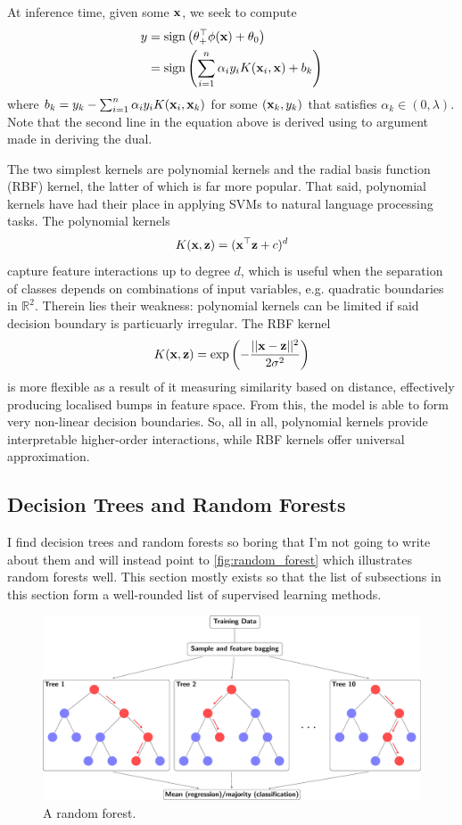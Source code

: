 \documentclass[11pt]{article}
\begin{document}
At inference time, given some $\mathbf{x}$, we seek to compute
\begin{align*}
    y
    &=
    \text{sign}\left(\theta_+^\top\phi(\mathbf{x})+\theta_0\right)\\
    &=
    \text{sign}\left(\sum_{i=1}^n\alpha_iy_iK(\mathbf{x}_i,\mathbf{x})+b_k\right)
\end{align*}
where $b_k=y_k-\sum_{i=1}^n\alpha_iy_iK(\mathbf{x}_i,\mathbf{x}_k)$ for some $(\mathbf{x}_k,y_k)$ that satisfies $\alpha_k\in(0,\lambda)$. Note that the second line in the equation above is derived using to argument made in deriving the dual.

The two simplest kernels are polynomial kernels and the radial basis function (RBF) kernel, the latter of which is far more popular. That said, polynomial kernels have had their place in applying SVMs to natural language processing tasks. The polynomial kernels
$$
K(\mathbf{x},\mathbf{z})
=
(\mathbf{x}^\top\mathbf{z}+c)^d
$$
capture feature interactions up to degree $d$, which is useful when the separation of classes depends on combinations of input variables, e.g. quadratic boundaries in $\mathbb{R}^2$. Therein lies their weakness: polynomial kernels can be limited if said decision boundary is particuarly irregular. The RBF kernel
$$
K(\mathbf{x},\mathbf{z})
=
\exp\left(-\frac{||\mathbf{x}-\mathbf{z}||^2}{2\sigma^2}\right)
$$
is more flexible as a result of it measuring similarity based on distance, effectively producing localised bumps in feature space. From this, the model is able to form very non-linear decision boundaries. So, all in all, polynomial kernels provide interpretable higher-order interactions, while RBF kernels offer universal approximation.

\subsection{Decision Trees and Random Forests}
I find decision trees and random forests so boring that I'm not going to write about them and will instead point to \autoref{fig:random_forest} which illustrates random forests well. This section mostly exists so that the list of subsections in this section form a well-rounded list of supervised learning methods.

\begin{figure}[t]
    \centering
    \includegraphics[width=\columnwidth]{./figures/supervised_learning/random_forest.pdf}
    \caption{A random forest.}
    \label{fig:random_forest}
\end{figure}
\end{document}
